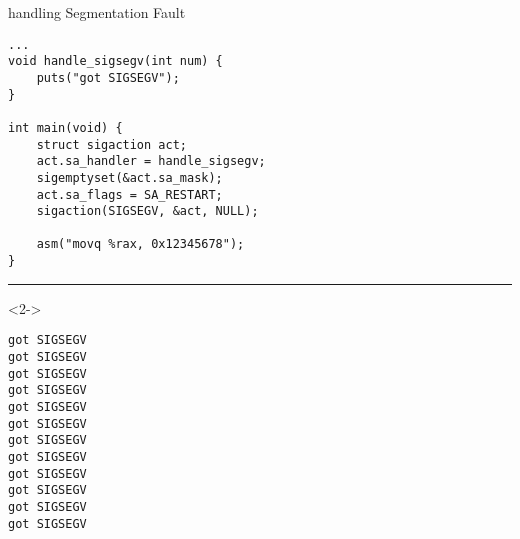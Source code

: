 \begin{frame}[fragile,label=handleSIGSEGV]{handling Segmentation Fault}
\lstset{language=C,style=smaller}
\begin{lstlisting}
...
void handle_sigsegv(int num) {
    puts("got SIGSEGV");
}

int main(void) {
    struct sigaction act;
    act.sa_handler = handle_sigsegv;
    sigemptyset(&act.sa_mask);
    act.sa_flags = SA_RESTART;
    sigaction(SIGSEGV, &act, NULL);

    asm("movq %rax, 0x12345678");
}
\end{lstlisting}
\hrule
\begin{visibleenv}<2->
\begin{Verbatim}
got SIGSEGV
got SIGSEGV
got SIGSEGV
got SIGSEGV
got SIGSEGV
got SIGSEGV
got SIGSEGV
got SIGSEGV
got SIGSEGV
got SIGSEGV
got SIGSEGV
got SIGSEGV
\end{Verbatim}
\end{visibleenv}
\end{frame}
